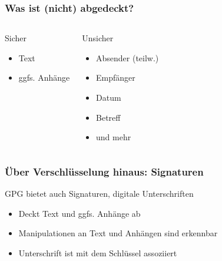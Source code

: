 \documentclass{beamer}
\begin{document}
\begin{frame}
  \frametitle{Was ist (nicht) abgedeckt?}
  \begin{columns}
    \begin{block}{Sicher}
      \begin{itemize}
      \item Text
      \item ggfs. Anhänge
      \end{itemize}
    \end{block}
    \begin{block}{Unsicher}
      \begin{itemize}
      \item Absender (teilw.)
      \item Empfänger
      \item Datum
      \item Betreff
      \item und mehr
      \end{itemize}
    \end{block}
  \end{columns}
\end{frame}

\begin{frame}
  \frametitle{Über Verschlüsselung hinaus: Signaturen}
  GPG bietet auch Signaturen, digitale Unterschriften
  \begin{itemize}
  \item Deckt Text und ggfs. Anhänge ab
  \item Manipulationen an Text und Anhängen sind erkennbar
  \item Unterschrift ist mit dem Schlüssel assoziiert
  \end{itemize}
\end{frame}
\end{document}
